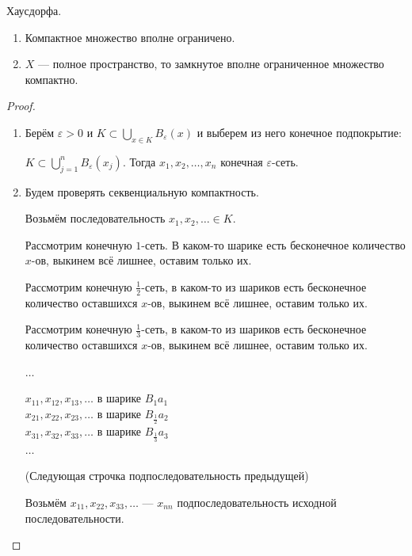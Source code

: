 \begin{theorem-non}
    Хаусдорфа.

    \begin{enumerate}
        \item Компактное множество вполне ограничено.
        \item $X$ --- полное пространство, то замкнутое вполне ограниченное множество компактно.
    \end{enumerate}

    \begin{proof} \quad  

        \begin{enumerate}
            \item Берём $\varepsilon > 0$  и $K \subset \bigcup\limits_{x \in K}B_{\varepsilon}(x)$ и выберем из него конечное подпокрытие:
            
            $K \subset \bigcup\limits_{j = 1}^n B_{\varepsilon}(x_j)$. Тогда $x_1, x_2, \dots, x_n$ конечная $\varepsilon$-сеть.

            \item 
            Будем проверять секвенциальную компактность.
            
            Возьмём последовательность $x_1, x_2, \dots \in K$.

            Рассмотрим конечную $1$-сеть.
            В каком-то шарике есть бесконечное количество $x$-ов, выкинем всё лишнее, оставим только их.
            
            Рассмотрим конечную $\frac{1}{2}$-сеть, в каком-то из шариков есть бесконечное количество оставшихся $x$-ов, выкинем всё лишнее, оставим только их.

            Рассмотрим конечную $\frac{1}{3}$-сеть, в каком-то из шариков есть бесконечное количество оставшихся $x$-ов, выкинем всё лишнее, оставим только их.

            $\dots$

            $x_{11}, x_{12}, x_{13}, \dots $ в шарике $B_1{a_1}$ \\
            $x_{21}, x_{22}, x_{23}, \dots $ в шарике $B_{\frac{1}{2}}{a_2}$ \\
            $x_{31}, x_{32}, x_{33}, \dots $ в шарике $B_{\frac{1}{3}}{a_3}$  \\
            $\dots$

            (Следующая строчка подпоследовательность предыдущей)

            Возьмём $x_{11}, x_{22}, x_{33}, \dots$ --- $x_{nn}$ подпоследовательность исходной последовательности.


\end{enumerate}
\end{proof}
\end{theorem-non}
